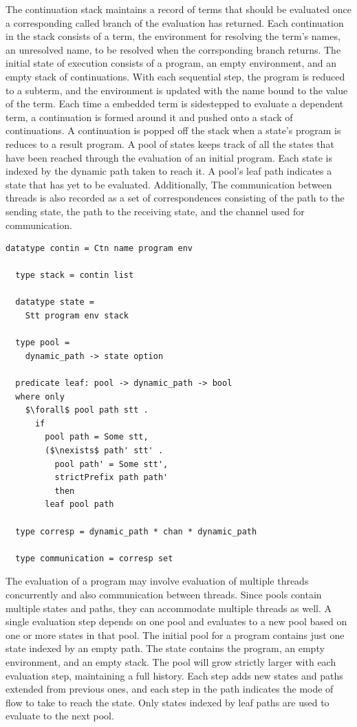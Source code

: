 \documentclass[letterpaper, 11pt]{extarticle}
\begin{document}
The continuation stack maintains a record of terms that should be evaluated
once a corresponding called branch of the evaluation has returned.
Each continuation in the stack consists of a term, the environment for resolving the
term's names, an unresolved name, to be resolved when the corrsponding branch returns. 
The initial state of execution consists of a program, an empty environment, and an empty stack
of continuations. With each sequential step, the program is reduced to a subterm,
and the environment is updated with the name bound to the value of the term. Each time a
embedded term is sidestepped to evaluate a dependent term, a continuation is formed around
it and pushed onto a stack of continuations. A continuation is popped off the stack when a
state's program is reduces to a result program.  A pool of states keeps track of all the states
that have been reached through the evaluation of an initial program.  Each state is indexed by
the dynamic path taken to reach it. A pool's leaf path indicates a state that has yet to be
evaluated. Additionally, The communication between threads is also recorded as a set of
correspondences consisting of the path to the sending state, the path to the receiving state,
and the channel used for communication.

\begin{lstlisting}[language=logic, mathescape]
  datatype contin = Ctn name program env

  type stack = contin list

  datatype state =
    Stt program env stack 

  type pool =
    dynamic_path -> state option

  predicate leaf: pool -> dynamic_path -> bool
  where only
    $\forall$ pool path stt .
      if
        pool path = Some stt,
        ($\nexists$ path' stt' .
          pool path' = Some stt',
          strictPrefix path path'
          then
        leaf pool path

  type corresp = dynamic_path * chan * dynamic_path

  type communication = corresp set 
\end{lstlisting}

The evaluation of a program may involve evaluation of multiple threads concurrently and also
communication between threads. Since pools contain multiple states and paths, they can
accommodate multiple threads as well.  A single evaluation step depends on one pool and
evaluates to a new pool based on one or more states in that pool. The initial pool for a
program contains just one state indexed by an empty path. The state contains the program, an
empty environment, and an empty stack. The pool will grow strictly larger with each evaluation
step, maintaining a full history. Each step adds new states and paths extended from previous
ones, and each step in the path indicates the mode of flow to take to reach the state.
Only states indexed by leaf paths are used to evaluate to the next pool.
\end{document}
